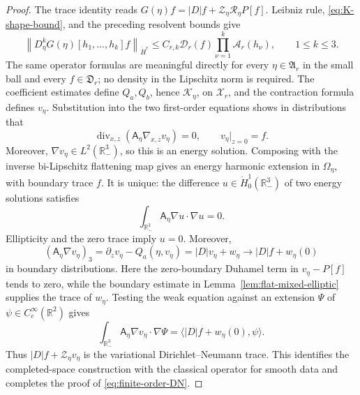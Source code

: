 \documentclass[10pt,a4paper]{amsart}
\newcommand{\R}{\mathbb{R}}
\begin{document}
\begin{proof}
The trace identity reads \(G(\eta)f=|D|f+\mathcal Z_\eta\mathcal R_\eta P[f]\).  Leibniz rule, \eqref{eq:K-shape-bound}, and the preceding resolvent bounds give
\[
 \left\| D_\eta^kG(\eta) [h_1,\ldots,h_k]f \right\|_{\dot H^r} \leq C_{r,k} \mathcal D_r(f) \prod_{\nu=1}^k \mathcal A_r(h_\nu), \qquad 1\leq k\leq3.
\]
The same operator formulas are meaningful directly for every
\(\eta\in\mathfrak A_r\) in the small ball and every
\(f\in\mathfrak D_r\); no density in the Lipschitz norm is required.
The coefficient estimates define \(Q_a,Q_b\), hence
\(\mathcal K_\eta\), on \(\mathcal X_r\), and the contraction formula
defines \(v_\eta\).  Substitution into the two first-order equations shows
in distributions that
\[
 \operatorname{div}_{x,z}(\mathsf A_\eta\nabla_{x,z}v_\eta)=0,
 \qquad v_\eta|_{z=0}=f.
\]
Moreover, \(\nabla v_\eta\in L^2(\R^3_-)\), so this is an energy
solution.  Composing with the inverse bi-Lipschitz flattening map gives an
energy harmonic extension in \(\Omega_\eta\), with boundary trace \(f\).
It is unique: the difference
\(u\in\dot H^1_0(\R^3_-)\) of two energy solutions satisfies
\[
 \int_{\R^3_-}\mathsf A_\eta\nabla u\cdot\nabla u=0.
\]
Ellipticity and the zero trace imply \(u=0\).  
Moreover,
\[
 (\mathsf A_\eta\nabla v_\eta)_3
 =\partial_zv_\eta-Q_a(\eta,v_\eta)=|D|v_\eta+w_\eta
 \longrightarrow |D|f+w_\eta(0)
\]
in boundary distributions.  Here the zero-boundary Duhamel term in
\(v_\eta-P[f]\) tends to zero, while the boundary estimate in
Lemma~\ref{lem:flat-mixed-elliptic} supplies the trace of \(w_\eta\).
Testing the weak equation against an extension \(\Psi\) of \(\psi\in C_c^\infty(\R^2)\) gives
\[
 \int_{\R^3_-}\mathsf A_\eta\nabla v_\eta\cdot\nabla\Psi =\langle |D|f+w_\eta(0),\psi\rangle.
\]
Thus \(|D|f+\mathcal Z_\eta v_\eta\) is the variational
Dirichlet--Neumann trace. This identifies the completed-space construction with the classical operator for smooth data and completes the proof of
\eqref{eq:finite-order-DN}.
\end{proof}
\end{document}
